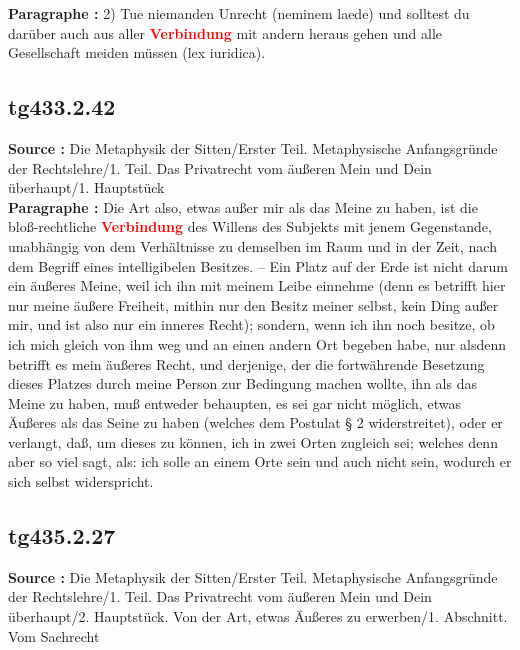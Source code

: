 \documentclass[a4paper,12pt,twoside]{book}
\newcommand{\match}[1]{\textcolor{red}{\textbf{#1}}}
\begin{document}
	\textbf{Paragraphe : }2) Tue niemanden Unrecht (neminem laede) und solltest du darüber auch aus aller \match{Verbindung} mit andern heraus gehen und alle Gesellschaft meiden müssen (lex iuridica). 
	
	\subsection*{tg433.2.42} 
	\textbf{Source : }Die Metaphysik der Sitten/Erster Teil. Metaphysische Anfangsgründe der Rechtslehre/1. Teil. Das Privatrecht vom äußeren Mein und Dein überhaupt/1. Hauptstück\\  
	
	\textbf{Paragraphe : }Die Art also, etwas außer mir als das Meine zu haben, ist die bloß-rechtliche \match{Verbindung} des Willens des Subjekts mit jenem Gegenstande, unabhängig von dem Verhältnisse zu demselben im Raum und in der Zeit, nach dem Begriff eines intelligibelen Besitzes. – Ein Platz auf der Erde ist nicht darum ein äußeres Meine, weil ich ihn mit meinem Leibe einnehme (denn es betrifft hier nur meine äußere Freiheit, mithin nur den Besitz meiner selbst, kein Ding außer mir, und ist also nur ein inneres Recht); sondern, wenn ich ihn noch besitze, ob ich mich gleich von ihm weg und an einen andern Ort begeben habe, nur alsdenn betrifft es mein äußeres Recht, und derjenige, der die fortwährende Besetzung dieses Platzes durch meine Person zur Bedingung machen wollte, ihn als das Meine zu haben, muß entweder behaupten, es sei gar nicht möglich, etwas Äußeres als das Seine zu haben (welches dem Postulat § 2 widerstreitet), oder er verlangt, daß, um dieses zu können, ich in zwei Orten zugleich sei; welches denn aber so viel sagt, als: ich solle an einem Orte sein und auch nicht sein, wodurch er sich selbst widerspricht. 
	
	\subsection*{tg435.2.27} 
	\textbf{Source : }Die Metaphysik der Sitten/Erster Teil. Metaphysische Anfangsgründe der Rechtslehre/1. Teil. Das Privatrecht vom äußeren Mein und Dein überhaupt/2. Hauptstück. Von der Art, etwas Äußeres zu erwerben/1. Abschnitt. Vom Sachrecht\\  
	
\end{document}
